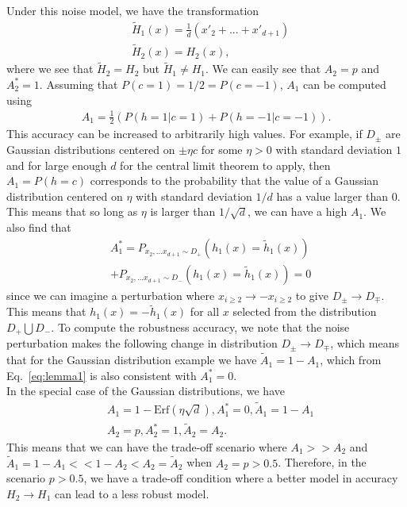 \documentclass[onecolumn,prx, superscriptaddress,longbibliography,margin=1mm 11pt]{revtex4-2}
\begin{document}
Under this noise model, we have the transformation
\begin{align}
    & \tilde{H}_1(x)=\frac{1}{d}(x'_2+...+x'_{d+1}) \nonumber \\
    & \tilde{H}_2(x)=H_2(x), 
\end{align}
where we see that $\tilde{H}_2=H_2$ but $\tilde{H}_{1} \neq H_{1}$. We can easily see that $A_2=p$ and $A^*_2=1$. Assuming that $P(c=1)=1/2=P(c=-1)$, $A_1$ can be computed using
\begin{align}
    A_1=\frac{1}{2}(P(h=1|c=1)+P(h=-1|c=-1)).
\end{align}
This accuracy can be increased to arbitrarily high values. For example, if $D_{\pm}$ are Gaussian distributions centered on $\pm \eta c$ for some $\eta>0$ with standard deviation $1$ and for large enough $d$ for the central limit theorem to apply, then $A_1=P(h=c)$ corresponds to the probability that the value of a Gaussian distribution centered on $\eta$ with standard deviation $1/d$ has a value larger than $0$. This means that so long as $\eta$ is larger than $1/\sqrt{d}$, we can have a high $A_1$.  We also find that
\begin{align}
   & A^*_1=P_{x_2,...x_{d+1}\sim D_+}(h_1(x)=\tilde{h}_1(x)) \nonumber \\
   &+P_{x_2,...x_{d+1}\sim D_-}(h_1(x)=\tilde{h}_1(x))=0
\end{align}
since we can imagine a perturbation where $x_{i\geq 2} \rightarrow -x_{i \geq 2}$ to give $D_{\pm} \rightarrow D_{\mp}$. This means that $h_1(x)=-\tilde{h}_1(x)$ for all $x$ selected from the distribution $D_+ \bigcup D_-$. To compute the robustness accuracy, we note that the noise perturbation makes the following change in distribution $D_{\pm} \rightarrow D_{\mp}$, which means that for the Gaussian distribution example we have $\tilde{A}_1=1-A_1$, which from Eq.~\eqref{eq:lemma1} is also consistent with $A^*_1=0$.\\

In the special case of the Gaussian distributions, we have
\begin{align}
    & A_1=1-\text{Erf}(\eta \sqrt{d}), A^*_1=0, \tilde{A}_1=1-A_1 \nonumber \\
    & A_2=p, A^*_2=1, \tilde{A}_2=A_2.
\end{align}
This means that we can have the trade-off scenario where $A_1>>A_2$ and $\tilde{A}_1=1-A_1<<1-A_2<A_2=\tilde{A}_2$ when $A_2=p>0.5$. Therefore, in the scenario $p>0.5$, we have a trade-off condition where a better model in accuracy $H_2 \rightarrow H_1$ can lead to a less robust model. 
\end{document}
